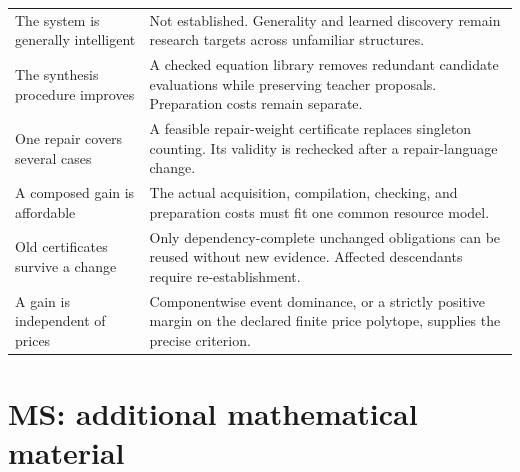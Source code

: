 \documentclass[11pt,oneside,openany]{book}
\numberwithin{equation}{section}
\begin{document}
\begin{small}
\begin{longtable}{@{}p{}p{}@{}}
The system is generally intelligent & Not established. Generality and learned discovery remain research targets across unfamiliar structures.\\The synthesis procedure improves & A checked equation library removes redundant candidate evaluations while preserving teacher proposals. Preparation costs remain separate.\\
One repair covers several cases & A feasible repair-weight certificate replaces singleton counting. Its validity is rechecked after a repair-language change.\\
A composed gain is affordable & The actual acquisition, compilation, checking, and preparation costs must fit one common resource model.\\
Old certificates survive a change & Only dependency-complete unchanged obligations can be reused without new evidence. Affected descendants require re-establishment.\\
A gain is independent of prices & Componentwise event dominance, or a strictly positive margin on the declared finite price polytope, supplies the precise criterion.\\
\bottomrule
\end{longtable}\end{small}




\chapter{MS: additional mathematical material}
\setcounter{section}{0}
\end{document}
